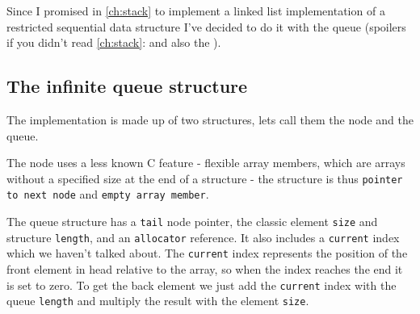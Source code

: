 Since I promised in \autoref{ch:stack} to implement a linked list implementation of a restricted sequential data structure I've decided to do it with the queue (spoilers if you didn't read \autoref{ch:stack}: and also the ).

\subsection{The infinite queue structure}

The implementation is made up of two structures, lets call them the node and the queue. 

The node uses a less known C feature - flexible array members, which are arrays without a specified size at the end of a structure - the structure is thus \texttt{pointer to next node} and \texttt{empty array member}.

The queue structure has a \texttt{tail} node pointer, the classic element \texttt{size} and structure \texttt{length}, and an \texttt{allocator} reference. It also includes a \texttt{current} index which we haven't talked about. The \texttt{current} index represents the position of the front element in head relative to the array, so when the index reaches the end it is set to zero. To get the back element we just add the \texttt{current} index with the queue \texttt{length} and multiply the result with the element \texttt{size}.

